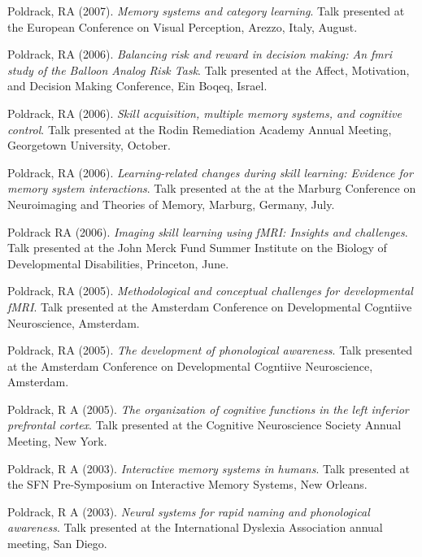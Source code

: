 \documentclass[10pt, letterpaper]{article}
\begin{document}
Poldrack, RA (2007). \emph{Memory systems and category learning}. Talk presented at the European Conference on Visual Perception, Arezzo, Italy, August. \vspace{2mm}

Poldrack, RA (2006). \emph{Balancing risk and reward in decision making: An fmri study of the Balloon Analog Risk Task}. Talk presented at the Affect, Motivation, and Decision Making Conference, Ein Boqeq, Israel. \vspace{2mm}

Poldrack, RA (2006). \emph{Skill acquisition, multiple memory systems, and cognitive control}. Talk presented at the Rodin Remediation Academy Annual Meeting, Georgetown University, October. \vspace{2mm}

Poldrack, RA (2006). \emph{Learning-related changes during skill learning: Evidence for memory system interactions}. Talk presented at the at the Marburg Conference on Neuroimaging and  Theories of Memory, Marburg, Germany,  July. \vspace{2mm}

Poldrack RA (2006). \emph{Imaging skill learning using fMRI: Insights and challenges}. Talk presented at the John Merck Fund Summer Institute on the Biology of Developmental Disabilities, Princeton, June. \vspace{2mm}

Poldrack, RA (2005). \emph{Methodological and conceptual challenges for developmental fMRI}. Talk presented at the Amsterdam Conference on Developmental Cogntiive Neuroscience, Amsterdam. \vspace{2mm}

Poldrack, RA (2005). \emph{The development of phonological awareness}. Talk presented at the Amsterdam Conference on Developmental Cogntiive Neuroscience, Amsterdam. \vspace{2mm}

Poldrack, R A (2005). \emph{The organization of cognitive functions in the left inferior prefrontal cortex}. Talk presented at the Cognitive Neuroscience Society Annual Meeting, New York. \vspace{2mm}

Poldrack, R A (2003). \emph{Interactive memory systems in humans}. Talk presented at the SFN Pre-Symposium on Interactive Memory Systems, New Orleans. \vspace{2mm}

Poldrack, R A (2003). \emph{Neural systems for rapid naming and phonological awareness}. Talk presented at the International Dyslexia Association annual meeting, San Diego. \vspace{2mm}
\end{document}
